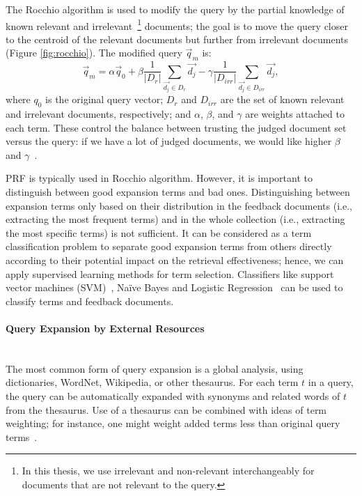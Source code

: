 The Rocchio algorithm is used to modify the query by the partial knowledge of known relevant and irrelevant~\footnote{In this thesis, we use irrelevant and non-relevant interchangeably for documents that are not relevant to the query.} documents; the goal is to move the query closer to the centroid of the relevant documents but further from irrelevant documents (Figure \ref{fig:rocchio}). The modified query $ \vec{q}_m $ is:
\begin{equation}
\label{eq:rocchio}
 \vec{q}_{m} = \alpha  \vec{q}_{0} + \beta\frac{1}{|D_{r}|}\sum\limits_{\vec{d_{j}}\in D_{r}} \vec{d_{j}} - \gamma\frac{1}{|D_{irr}|}\sum\limits_{\vec{d_{j}}\in D_{irr}} \vec{d_{j}},
  \end{equation}
where $ q_{0} $ is the original query vector; $ D_{r} $ and $ D_{irr} $ are the set of known relevant and irrelevant documents, respectively; and $ \alpha $, $ \beta $, and $ \gamma $ are weights attached to each term. These control the balance between trusting the judged document set versus the query: if we have a lot of judged documents, we
would like higher $ \beta $ and $ \gamma $~\citep{manning2008introduction}. 

PRF is typically used in Rocchio algorithm. However, it is important to distinguish between good expansion terms and bad ones. Distinguishing between expansion terms only based on their distribution in the feedback documents (i.e., extracting the most frequent terms) and in the whole collection (i.e., extracting the most specific terms) is not sufficient. It can be considered as a term classification problem to separate good expansion terms from others directly according to their potential impact on the retrieval effectiveness; hence, we can apply supervised learning methods for term selection. Classifiers like support vector machines (SVM)~\citep{cao2008selecting}, Na\"ive Bayes and Logistic Regression~\citep{he2009finding} can be used to classify terms and feedback documents.  
\paragraph{Query Expansion by External Resources}
\ \\
The most common form of query expansion is a global analysis, using dictionaries, WordNet, Wikipedia, or other thesaurus. For each term $ t $ in a query, the query can be automatically expanded with synonyms and related words of $ t $ from the thesaurus. Use of a thesaurus can be combined with ideas of term weighting; for instance, one might weight added terms less than original query terms~\citep{manning2008introduction}.